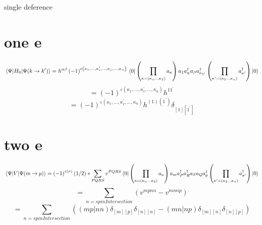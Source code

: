 \documentclass{article}
\begin{document}
single deference
\section{one e}
\begin{equation}
    \mel{\Psi }{H_{0}}{\Psi (k\rightarrow k^{\prime})}=h^{\alpha\beta}\left(-1\right)^{\varepsilon\left(\kappa_{1},\dots,\kappa_{i}^{\prime},\dots,\kappa _{j},...,\kappa_{n}\right)}\\
    \bra{0}\left(\prod_{\kappa=\left(\kappa_{n}\dots\kappa_{2}\right)}a_{\kappa}\right)
        a_{1}a^{\dag}_{\alpha  }a_{\beta }a^{\dag}_{\kappa _{1^{\prime}}}
    \left(\prod_{\kappa^{\prime}=\left(\kappa_{2}\dots\kappa_{n}\right)}a^{\dag}_{\kappa^{\prime}}\right)\ket{0}
\end{equation}
\begin{equation}
    =\left(-1\right)^{\varepsilon\left(\kappa_{1},\dots,\kappa_{i}^{\prime},\dots,\kappa_{n}\right)}h^{11^{\prime}}
\end{equation}
\begin{equation}
    =\left(-1\right)^{\varepsilon\left(\kappa_{1},\dots,\kappa_{i}^{\prime},\dots,\kappa_{n}\right)}h^{(1)(1^{\prime})}\delta _{[1][1^{\prime}]}
\end{equation}
\section{two e}
\begin{equation}
    \mel{\Psi }{V}{\Psi (m\rightarrow p)}=\left(-1\right)^{\varepsilon\left(\kappa\right)}(1/2)*\sum_{PQRS} v^{PQRS }\\
    \bra{0}\left(\prod_{\kappa=\left(\kappa_{n}\dots\kappa_{2}\right)}a_{\kappa}\right)
        a_{m}a^{\dag}_{P }a^{\dag}_{R }a_{S }a_{Q }a^{\dag}_{p}
    \left(\prod_{\kappa^{\prime}=\left(\kappa_{2}\dots\kappa_{n}\right)}a^{\dag}_{\kappa^{\prime}}\right)\ket{0}
\end{equation}
\begin{equation}
    =\sum_{n=spinIntersection}\left(v^{mpnn}-v^{mnnp}\right) 
\end{equation}
\begin{equation}
    =\sum_{n=spinIntersection}\left((mp|nn)\delta _{[m][p]}\delta _{[n][n]}-(mn|np)\delta _{[m][n]}\delta _{[n][p]}\right)
\end{equation}
\end{document}
